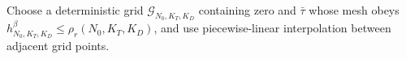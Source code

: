 Choose a deterministic grid \(\mathcal G_{N_0,K_T,K_D}\) containing zero and \(\bar\tau\) whose mesh obeys \(h_{N_0,K_T,K_D}^\beta\le\rho_r(N_0,K_T,K_D)\), and use piecewise-linear interpolation between adjacent grid points.